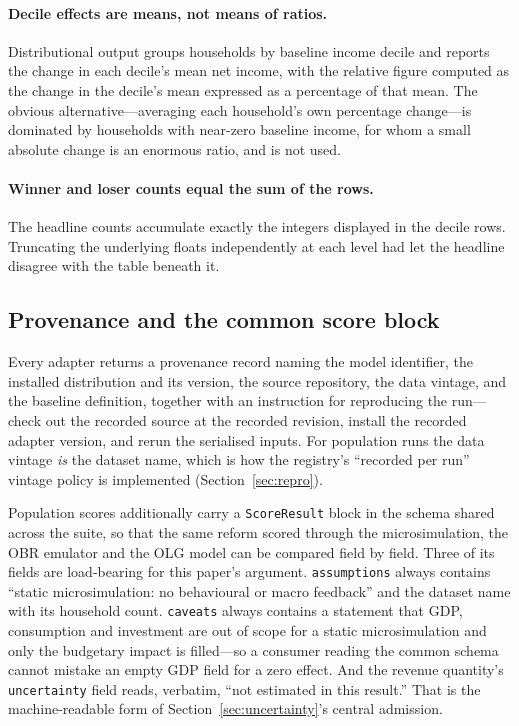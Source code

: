 \paragraph{Decile effects are means, not means of ratios.} Distributional output groups households by baseline income decile and reports the change in each decile's mean net income, with the relative figure computed as the change in the decile's mean expressed as a percentage of that mean. The obvious alternative---averaging each household's own percentage change---is dominated by households with near-zero baseline income, for whom a small absolute change is an enormous ratio, and is not used.

\paragraph{Winner and loser counts equal the sum of the rows.} The headline counts accumulate exactly the integers displayed in the decile rows. Truncating the underlying floats independently at each level had let the headline disagree with the table beneath it.

\subsection{Provenance and the common score block}

Every adapter returns a provenance record naming the model identifier, the installed distribution and its version, the source repository, the data vintage, and the baseline definition, together with an instruction for reproducing the run---check out the recorded source at the recorded revision, install the recorded adapter version, and rerun the serialised inputs. For population runs the data vintage \emph{is} the dataset name, which is how the registry's ``recorded per run'' vintage policy is implemented (Section~\ref{sec:repro}).

Population scores additionally carry a \texttt{ScoreResult} block in the schema shared across the suite, so that the same reform scored through the microsimulation, the OBR emulator and the OLG model can be compared field by field. Three of its fields are load-bearing for this paper's argument. \texttt{assumptions} always contains ``static microsimulation: no behavioural or macro feedback'' and the dataset name with its household count. \texttt{caveats} always contains a statement that GDP, consumption and investment are out of scope for a static microsimulation and only the budgetary impact is filled---so a consumer reading the common schema cannot mistake an empty GDP field for a zero effect. And the revenue quantity's \texttt{uncertainty} field reads, verbatim, ``not estimated in this result.'' That is the machine-readable form of Section~\ref{sec:uncertainty}'s central admission.

